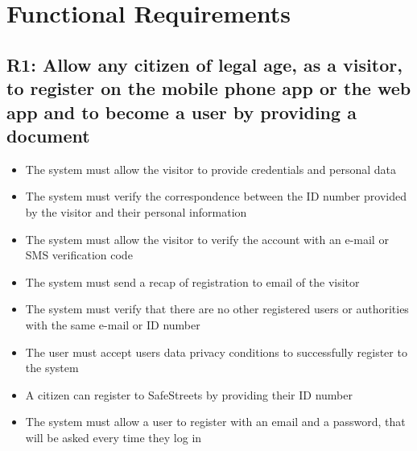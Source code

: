 \section{Functional Requirements}

\subsection{R1: Allow any citizen of legal age, as a visitor, to register on the mobile phone app or the web app and to become a user by providing a document}
\begin{itemize}
    \item The system must allow the visitor to provide credentials and personal data
    \item The system must verify the correspondence between the ID number provided by the visitor and their personal information
    \item The system must allow the visitor to verify the account with an e-mail or SMS verification code
    \item The system must send a recap of registration to email of the visitor
    \item The system must verify that there are no other registered users or authorities with the same e-mail or ID number
    \item The user must accept users data privacy conditions to successfully register to the system
    \item A citizen can register to SafeStreets by providing their ID number
    \item The system must allow a user to register with an email and a password, that will be asked every time they log in
\end{itemize}

